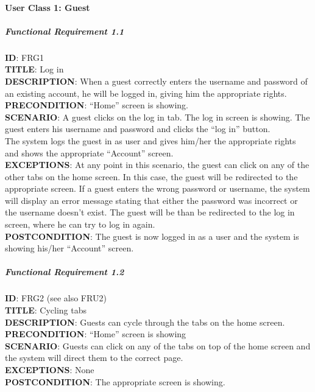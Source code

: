 \documentclass[9pt]{article}
\begin{document}
\paragraph{User Class 1: Guest}\label{user-class-1-guest}

\subparagraph{Functional Requirement
1.1}\label{functional-requirement-1.1}

\textbf{ID}: FRG1\\\textbf{TITLE}: Log in\\\textbf{DESCRIPTION}: When a
guest correctly enters the username and password of an existing account,
he will be logged in, giving him the appropriate
rights.\\\textbf{PRECONDITION}: ``Home'' screen is
showing.\\\textbf{SCENARIO}: A guest clicks on the log in tab. The log
in screen is showing. The guest enters his username and password and
clicks the ``log in'' button.\\The system logs the guest in as user and
gives him/her the appropriate rights and shows the appropriate
``Account'' screen.\\\textbf{EXCEPTIONS}: At any point in this scenario,
the guest can click on any of the other tabs on the home screen. In this
case, the guest will be redirected to the appropriate screen. If a guest
enters the wrong password or username, the system will display an error
message stating that either the password was incorrect or the username
doesn't exist. The guest will be than be redirected to the log in
screen, where he can try to log in again.\\\textbf{POSTCONDITION}: The
guest is now logged in as a user and the system is showing his/her
``Account'' screen.

\subparagraph{Functional Requirement
1.2}\label{functional-requirement-1.2}

\textbf{ID}: FRG2 (see also FRU2)\\\textbf{TITLE}: Cycling
tabs\\\textbf{DESCRIPTION}: Guests can cycle through the tabs on the
home screen.\\\textbf{PRECONDITION}: ``Home'' screen is
showing\\\textbf{SCENARIO}: Guests can click on any of the tabs on top
of the home screen and the system will direct them to the correct
page.\\\textbf{EXCEPTIONS}: None\\\textbf{POSTCONDITION}: The
appropriate screen is showing.
\end{document}
